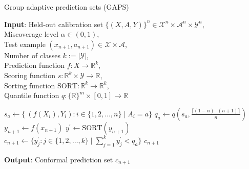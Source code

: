 \documentclass[letterpaper]{article} %
\begin{document}
    \begin{algorithm}[tb]
        \small
        \caption{Group adaptive prediction sets (GAPS)}
        \label{alg:gaps}
        \textbf{Input}: 
        Held-out calibration set $\{(X, A, Y)\}^n \in \mathcal{X}^n \times \mathcal{A}^n \times \mathcal{Y}^n$, \\ 
        Miscoverage level $\alpha \in (0, 1)$, \\
        Test example $\left(x_{n+1}, a_{n+1}\right) \in \mathcal{X} \times \mathcal{A}$, \\ 
        Number of classes $k := \lvert\mathcal{Y}\rvert$, \\ 
        Prediction function $f: X \rightarrow \mathbb{R}^k$, \\
        Scoring function $s: \mathbb{R}^k \times \mathcal{Y} \rightarrow \mathbb{R} $, \\
        Sorting function $\mathrm{SORT}: \mathbb{R}^k \rightarrow \mathbb{R}^k$, \\
        Quantile function $q: \{\mathbb{R}\}^m \times [0, 1] \rightarrow \mathbb{R}$\\
        \begin{algorithmic}[1] %
                \STATE $s_a \leftarrow \{\ \left(f(X_i), Y_i\right) : i \in \{1, 2, \ldots, n\} \mid A_i = a\}$
                \STATE $q_a \leftarrow q(s_a, \frac{\lceil (1 - \alpha) \cdot (n + 1) \rceil}{n})$
            \ENDFOR
                    \STATE $y_{n+1} \leftarrow f(x_{n+1})$
                    \STATE $y^\prime \leftarrow \mathrm{SORT}(y_{n+1})$
                    \STATE $c_{n+1} \leftarrow \{y^\prime_j : j \in \{1, 2, \ldots, k\} \mid \sum_{j=1}^k y^\prime_j < q_a \}$
                \ENDIF
            \ENDFOR
            \RETURN $c_{n+1}$
        \end{algorithmic}
        \textbf{Output}: Conformal prediction set $c_{n+1}$ \\
    \end{algorithm}
    
\end{document}
